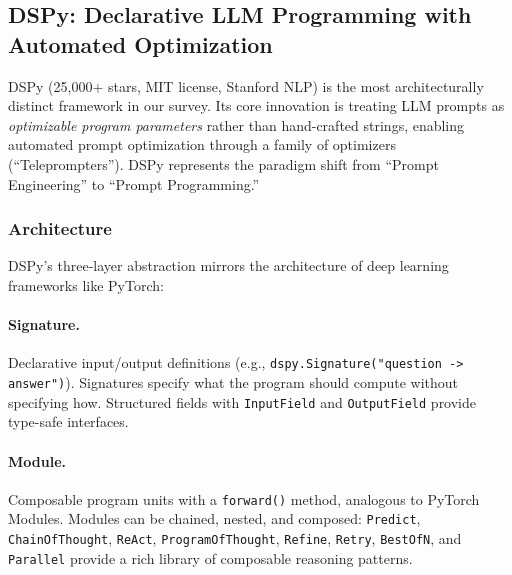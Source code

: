 \subsection{DSPy: Declarative LLM Programming with Automated Optimization}

DSPy (25,000+ stars, MIT license, Stanford NLP) is the most architecturally distinct framework in our survey. Its core innovation is treating LLM prompts as \emph{optimizable program parameters} rather than hand-crafted strings, enabling automated prompt optimization through a family of optimizers (``Teleprompters''). DSPy represents the paradigm shift from ``Prompt Engineering'' to ``Prompt Programming.''

\subsubsection{Architecture}

DSPy's three-layer abstraction mirrors the architecture of deep learning frameworks like PyTorch:

\paragraph{Signature.}
Declarative input/output definitions (e.g., \texttt{dspy.Signature("question -> answer")}). Signatures specify what the program should compute without specifying how. Structured fields with \texttt{InputField} and \texttt{OutputField} provide type-safe interfaces.

\paragraph{Module.}
Composable program units with a \texttt{forward()} method, analogous to PyTorch Modules. Modules can be chained, nested, and composed: \texttt{Predict}, \texttt{ChainOfThought}, \texttt{ReAct}, \texttt{ProgramOfThought}, \texttt{Refine}, \texttt{Retry}, \texttt{BestOfN}, and \texttt{Parallel} provide a rich library of composable reasoning patterns.

